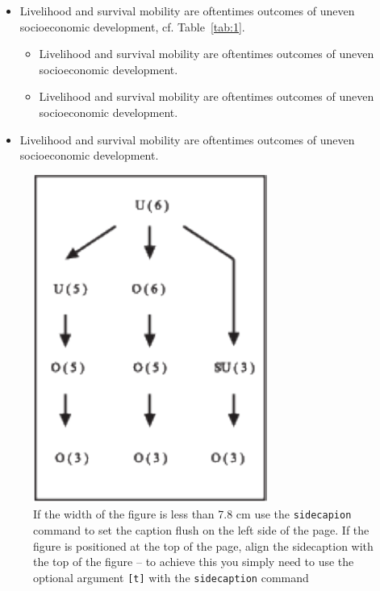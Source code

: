 \documentclass[graybox]{svmult}
\begin{document}
\begin{itemize}
\item{Livelihood and survival mobility are oftentimes outcomes of uneven socioeconomic development, cf. Table~\ref{tab:1}.}
\begin{itemize}
\item{Livelihood and survival mobility are oftentimes outcomes of uneven socioeconomic development.}
\item{Livelihood and survival mobility are oftentimes outcomes of uneven socioeconomic development.}
\end{itemize}
\item{Livelihood and survival mobility are oftentimes outcomes of uneven socioeconomic development.}
\end{itemize}




\begin{figure}[t]
\sidecaption[t]
\includegraphics[scale=.65]{figure}
%
%
\caption{If the width of the figure is less than 7.8 cm use the \texttt{sidecapion} command
to set the caption flush on the left side of the page. If the figure is positioned at
the top of the page, align the sidecaption with the top of the figure -- to achieve
this you simply need to use the optional argument \texttt{[t]} with the
\texttt{sidecaption} command}
\label{fig:2}       %
\end{figure}
\end{document}
